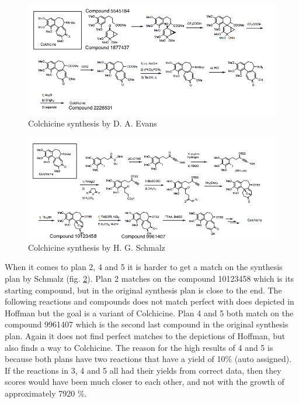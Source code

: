 \documentclass[a4paper,10pt,titlepage]{paper}
\begin{document}
\begin{figure}
\centering
\includegraphics[scale=0.5, angle=90]{Synteseplaner/Colchicine/Evans.png}
\caption{Colchicine synthesis by D. A. Evans \cite{SynthesisPlans}}
\label{fig::Evans}
\end{figure}

\begin{figure}
\centering
\includegraphics[scale=0.5, angle=90]{Synteseplaner/Colchicine/Schmalz.png}
\caption{Colchicine synthesis by H. G. Schmalz  \cite{SynthesisPlans}}
\label{fig::Schmalz}
\end{figure}

When it comes to plan 2, 4 and 5 it is harder to get a match on the synthesis plan by Schmalz (fig. \ref{fig::Schmalz}). Plan 2 matches on the compound 10123458 which is its starting compound, but in the original synthesis plan is close to the end. The following reactions and compounds does not match perfect with does depicted in Hoffman but the goal is a variant of Colchicine. Plan 4 and 5 both match on the compound 9961407 which is the second last compound in the original synthesis plan. Again it does not find perfect matches to the depictions of Hoffman, but also finds a way to Colchicine. The reason for the high results of 4 and 5 is because both plans have two reactions that have a yield of 10\% (auto assigned).\\
If the reactions in 3, 4 and 5 all had their yields from correct data, then they scores would have been much closer to each other, and not with the growth of approximately 7920 \%. 
\end{document}
